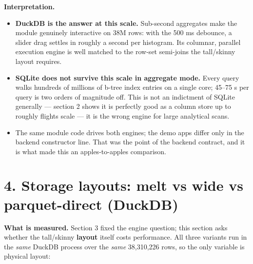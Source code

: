 \documentclass[
  11pt,
]{article}
\providecommand{\tightlist}{%
  \setlength{\itemsep}{0pt}\setlength{\parskip}{0pt}}
\begin{document}
\textbf{Interpretation.}

\begin{itemize}
\tightlist
\item
  \textbf{DuckDB is the answer at this scale.} Sub-second aggregates
  make the module genuinely interactive on 38M rows: with the 500 ms
  debounce, a slider drag settles in roughly a second per histogram. Its
  columnar, parallel execution engine is well matched to the row-set
  semi-joins the tall/skinny layout requires.
\item
  \textbf{SQLite does not survive this scale in aggregate mode.} Every
  query walks hundreds of millions of b-tree index entries on a single
  core; 45--75 s per query is two orders of magnitude off. This is not
  an indictment of SQLite generally --- section 2 shows it is perfectly
  good as a column store up to roughly flights scale --- it is the wrong
  engine for large analytical scans.
\item
  The same module code drives both engines; the demo apps differ only in
  the backend constructor line. That was the point of the backend
  contract, and it is what made this an apples-to-apples comparison.
\end{itemize}

\section{4. Storage layouts: melt vs wide vs parquet-direct
(DuckDB)}\label{storage-layouts-melt-vs-wide-vs-parquet-direct-duckdb}

\textbf{What is measured.} Section 3 fixed the engine question; this
section asks whether the tall/skinny \textbf{layout} itself costs
performance. All three variants run in the \emph{same} DuckDB process
over the \emph{same} 38,310,226 rows, so the only variable is physical
layout:
\end{document}
